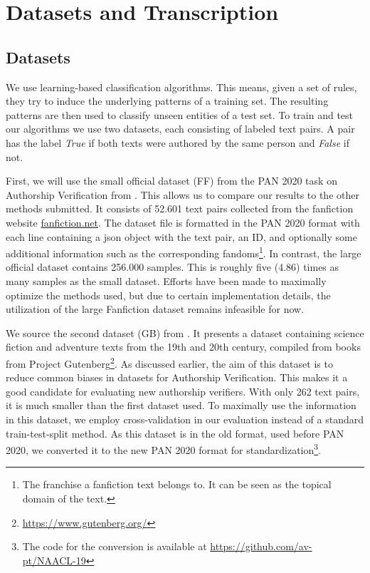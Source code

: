 \chapter{Datasets and Transcription}\label{ch:datasets}
\section{Datasets}\label{sec:datasets}
We use learning-based classification algorithms.
This means, given a set of rules, they try to induce the underlying patterns of a training set.
The resulting patterns are then used to classify unseen entities of a test set.
To train and test our algorithms we use two datasets, each consisting of labeled text pairs.
A pair has the label \textit{True} if both texts were authored by the same person and \textit{False} if not.

First, we will use the small official dataset (FF) from the PAN 2020 task on Authorship Verification from \cite{bevendorff2020overview}.
This allows us to compare our results to the other methods submitted.
It consists of 52.601 text pairs collected from the fanfiction website \url{fanfiction.net}.
The dataset file is formatted in the PAN 2020 format with each line containing a json object with the text pair, an ID, and optionally some additional information such as the corresponding fandoms\footnote{The franchise a fanfiction text belongs to. It can be seen as the topical domain of the text.}.
In contrast, the large official dataset contains 256.000 samples.
This is roughly five (4.86) times as many samples as the small dataset.
Efforts have been made to maximally optimize the methods used, but due to certain implementation details, the utilization of the large Fanfiction dataset remains infeasible for now.

We source the second dataset (GB) from \cite{stein2019unbiasedGutenbergCorpus}.
It presents a dataset containing science fiction and adventure texts from the 19th and 20th century, compiled from books from Project Gutenberg\footnote{\url{https://www.gutenberg.org/}}.
As discussed earlier, the aim of this dataset is to reduce common biases in datasets for Authorship Verification.
This makes it a good candidate for evaluating new authorship verifiers.
With only 262 text pairs, it is much smaller than the first dataset used.
To maximally use the information in this dataset, we employ cross-validation in our evaluation instead of a standard train-test-split method.
As this dataset is in the old format, used before PAN 2020, we converted it to the new PAN 2020 format for standardization\footnote{The code for the conversion is available at \url{https://github.com/av-pt/NAACL-19}}.

